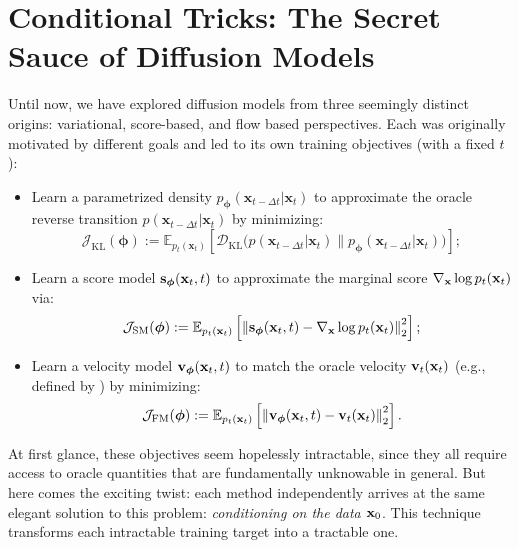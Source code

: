 \newpage

\section{Conditional Tricks: The Secret Sauce of Diffusion Models}\label{sec:conditional-trick}
Until now, we have explored diffusion models from three seemingly distinct origins: variational, score-based, and flow based perspectives. Each was originally motivated by different goals and led to its own training objectives (with a fixed $t$):
\begin{itemize}
    \item {} Learn a parametrized density $p_{\bm{\phi}}(\mathbf{x}_{t-\Delta t}|\mathbf{x}_t)$ to approximate the oracle reverse transition $p(\mathbf{x}_{t-\Delta t}|\mathbf{x}_t)$ by minimizing:
    \[
    \mathcal{J}_{\text{KL}}(\bm{\phi}) := \mathbb{E}_{p_t(\mathbf{x}_t)}\left[
        \mathcal{D}_{\mathrm{KL}}\big(p(\mathbf{x}_{t-\Delta t}|\mathbf{x}_t) \| p_{\bm{\phi}}(\mathbf{x}_{t-\Delta t}|\mathbf{x}_t)\big)
    \right];
    \]
    \item {} Learn a score model ${\mathbf{s}}_{\bm{\phi}}({\mathbf{x}}_t, t)$ to approximate the marginal score $\nabla_{{\mathbf{x}}} \log p_t({\mathbf{x}}_t)$ via:
    \[
    \mathcal{J}_{\text{SM}}(\bm{\phi}) := \mathbb{E}_{p_t({\mathbf{x}}_t)}\left[
       \left\| {\mathbf{s}}_{\bm{\phi}}({\mathbf{x}}_t, t) - \nabla_{{\mathbf{x}}} \log p_t({\mathbf{x}}_t) \right\|_2^2
    \right];
    \]
    \item {} Learn a velocity model ${\mathbf{v}}_{\bm{\phi}}({\mathbf{x}}_t, t)$ to match the oracle velocity ${\mathbf{v}}_t({\mathbf{x}}_t)$ (e.g., defined by ) by minimizing:
    \[
    \mathcal{J}_{\text{FM}}(\bm{\phi}) := \mathbb{E}_{p_t({\mathbf{x}}_t)} \left[
        \left\| {\mathbf{v}}_{\bm{\phi}}({\mathbf{x}}_t, t) - {\mathbf{v}}_t({\mathbf{x}}_t) \right\|_2^2
    \right].
    \]
\end{itemize}

At first glance, these objectives seem hopelessly intractable, since they all require access to oracle quantities that are fundamentally unknowable in general. But here comes the exciting twist: each method independently arrives at the same elegant solution to this problem: \emph{conditioning on the data ${\mathbf{x}}_0$}. This technique transforms each intractable training target into a tractable one.



